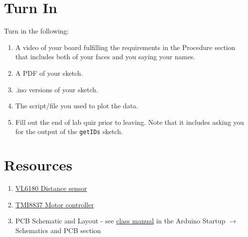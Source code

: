 
\section{Turn In}
Turn in the following:
\begin{enumerate}
    \item A video of your board fulfilling the requirements in the Procedure section 
            that includes both of your faces and you saying your names.
    \item A PDF of your sketch.
    \item .ino versions of your sketch.
    \item The script/file you used to plot the data.
    \item Fill out the end of lab quiz prior to leaving. Note that it includes asking you 
            for the output of the \lstinline$getIDs$ sketch. 
\end{enumerate}

\section{Resources}\label{sec:distmotorservoresources}
\begin{enumerate}
    \item \href{https://www.st.com/resource/en/datasheet/vl6180.pdf}{VL6180 Distance sensor}
    \item \href{https://datasheet.lcsc.com/lcsc/2001060933_TMI-TMI8837_C478955.pdf}{TMI8837 Motor controller}
    \item PCB Schematic and Layout - see 
            \href{https://github.com/semcneil/Fundamentals-of-Microcontrollers-Manual}{class manual} 
            in the Arduino Startup $\rightarrow$ Schematics and PCB section
\end{enumerate}

